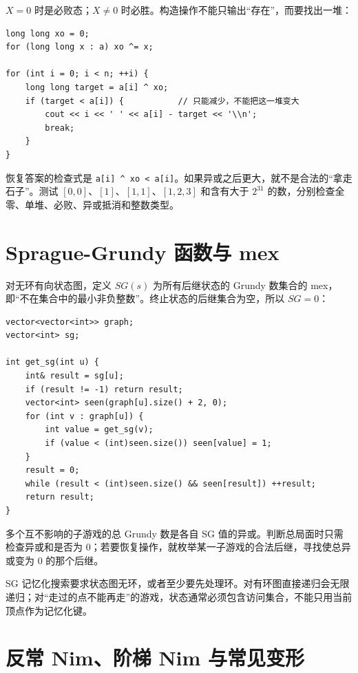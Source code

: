 \documentclass[UTF8,openany,oneside,zihao=-4]{ctexbook}
\begin{document}
$X=0$ 时是必败态；$X\ne0$ 时必胜。构造操作不能只输出“存在”，而要找出一堆：

\begin{lstlisting}
long long xo = 0;
for (long long x : a) xo ^= x;

for (int i = 0; i < n; ++i) {
    long long target = a[i] ^ xo;
    if (target < a[i]) {           // 只能减少，不能把这一堆变大
        cout << i << ' ' << a[i] - target << '\\n';
        break;
    }
}
\end{lstlisting}

恢复答案的检查式是 \lstinline|a[i] ^ xo < a[i]|。如果异或之后更大，就不是合法的“拿走石子”。测试 $[0,0]$、$[1]$、$[1,1]$、$[1,2,3]$ 和含有大于 $2^{31}$ 的数，分别检查全零、单堆、必败、异或抵消和整数类型。

\section{Sprague-Grundy 函数与 mex}

对无环有向状态图，定义 $SG(s)$ 为所有后继状态的 Grundy 数集合的 mex，即“不在集合中的最小非负整数”。终止状态的后继集合为空，所以 $SG=0$：

\begin{lstlisting}
vector<vector<int>> graph;
vector<int> sg;

int get_sg(int u) {
    int& result = sg[u];
    if (result != -1) return result;
    vector<int> seen(graph[u].size() + 2, 0);
    for (int v : graph[u]) {
        int value = get_sg(v);
        if (value < (int)seen.size()) seen[value] = 1;
    }
    result = 0;
    while (result < (int)seen.size() && seen[result]) ++result;
    return result;
}
\end{lstlisting}

多个互不影响的子游戏的总 Grundy 数是各自 SG 值的异或。判断总局面时只需检查异或和是否为 0；若要恢复操作，就枚举某一子游戏的合法后继，寻找使总异或变为 0 的那个后继。

\begin{warn}
SG 记忆化搜索要求状态图无环，或者至少要先处理环。对有环图直接递归会无限递归；对“走过的点不能再走”的游戏，状态通常必须包含访问集合，不能只用当前顶点作为记忆化键。
\end{warn}

\section{反常 Nim、阶梯 Nim 与常见变形}
\end{document}
